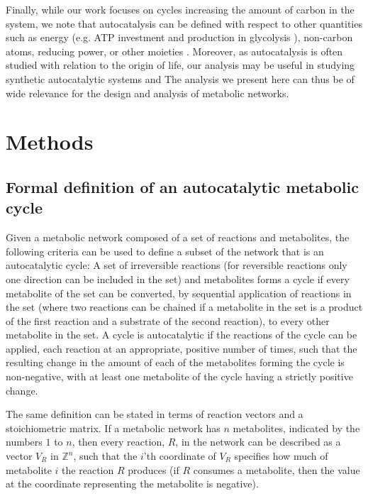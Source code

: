 Finally, while our work focuses on cycles increasing the amount of carbon in the system, we note that autocatalysis can be defined with respect to other quantities such as energy (e.g. ATP investment and production in glycolysis \cite{Teusink1998-he}), non-carbon atoms, reducing power, or other moieties \cite{Reich1981-qd}.
  Moreover, as autocatalysis is often studied with relation to the origin of life, our analysis may be useful in studying synthetic autocatalytic systems \cite{Semenov2016-ol} and 
  The analysis we present here can thus be of wide relevance for the design and analysis of metabolic networks.

  \section{Methods}
  \subsection{Formal definition of an autocatalytic metabolic cycle}
  Given a metabolic network composed of a set of reactions and metabolites, the following criteria can be used to define a subset of the network that is an autocatalytic cycle:
A set of irreversible reactions (for reversible reactions only one direction can be included in the set) and metabolites forms a cycle if every metabolite of the set can be converted, by sequential application of reactions in the set (where two reactions can be chained if a metabolite in the set is a product of the first reaction and a substrate of the second reaction), to every other metabolite in the set.
A cycle is autocatalytic if the reactions of the cycle can be applied, each reaction at an appropriate, positive number of times, such that the resulting change in the amount of each of the metabolites forming the cycle is non-negative, with at least one metabolite of the cycle having a strictly positive change.

The same definition can be stated in terms of reaction vectors and a stoichiometric matrix.
If a metabolic network has $n$ metabolites, indicated by the numbers $1$ to $n$, then every reaction, $R$, in the network can be described as a vector $V_R$ in $\mathbb{Z}^n$, such that the $i$'th coordinate of $V_R$ specifies how much of metabolite $i$ the reaction $R$ produces (if $R$ consumes a metabolite, then the value at the coordinate representing the metabolite is negative).

